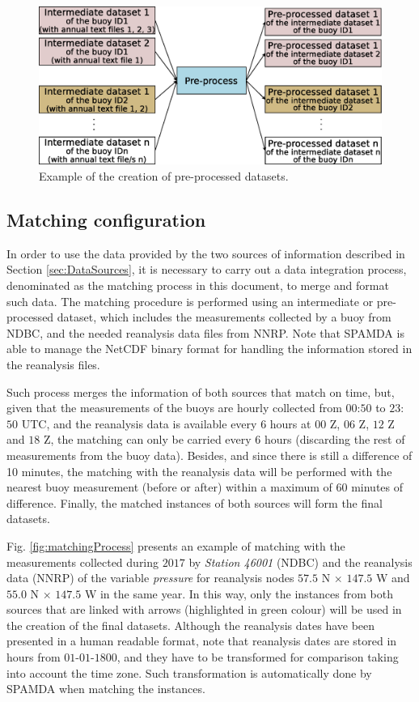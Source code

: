 \documentclass[energies,article,submit,moreauthors,pdftex]{Definitions/mdpi}
\begin{document}
				\begin{figure}[ht!]
					\centering
					\includegraphics[scale=0.36]{figures/FigurePreprocess.eps}
					\caption{Example of the creation of pre-processed datasets.}
					\label{fig:preprocess}
				\end{figure}
				
				
			\subsection{Matching configuration}
			\label{sec:matching_conf}
			
				In order to use the data provided by the two sources of information described in Section \ref{sec:DataSources}, it is necessary to carry out a data integration process, denominated as the matching process in this document, to merge and format such data. The matching procedure is performed using an intermediate or pre-processed dataset, which includes the measurements collected by a buoy from NDBC, and the needed reanalysis data files from NNRP. Note that SPAMDA is able to manage the NetCDF binary format for handling the information stored in the reanalysis files.
				
				Such process merges the information of both sources that match on time, but, given that the measurements of the buoys are hourly collected from $00$:$50$ to $23$:$50$ UTC, and the reanalysis data is available every $6$ hours at $00$ Z, $06$ Z, $12$ Z and $18$ Z, the matching can only be carried every $6$ hours (discarding the rest of measurements from the buoy data). Besides, and since there is still a difference of 10 minutes, the matching with the reanalysis data will be performed with the nearest buoy measurement (before or after) within a maximum of 60 minutes of difference. Finally, the matched instances of both sources will form the final datasets.
				
				Fig. \ref{fig:matchingProcess} presents an example of matching with the measurements collected during $2017$ by \textit{Station 46001} (NDBC) and the reanalysis data (NNRP) of the variable \textit{pressure} for reanalysis nodes $57.5$ N $\times$ $147.5$ W and $55.0$ N $\times$ $147.5$ W in the same year. In this way, only the instances from both sources that are linked with arrows (highlighted in green colour) will be used in the creation of the final datasets. Although the reanalysis dates have been presented in a human readable format, note that reanalysis dates are stored in hours from $01$-$01$-$1800$, and they have to be transformed for comparison taking into account the time zone. Such transformation is automatically done by SPAMDA when matching the instances.
				
\end{document}
